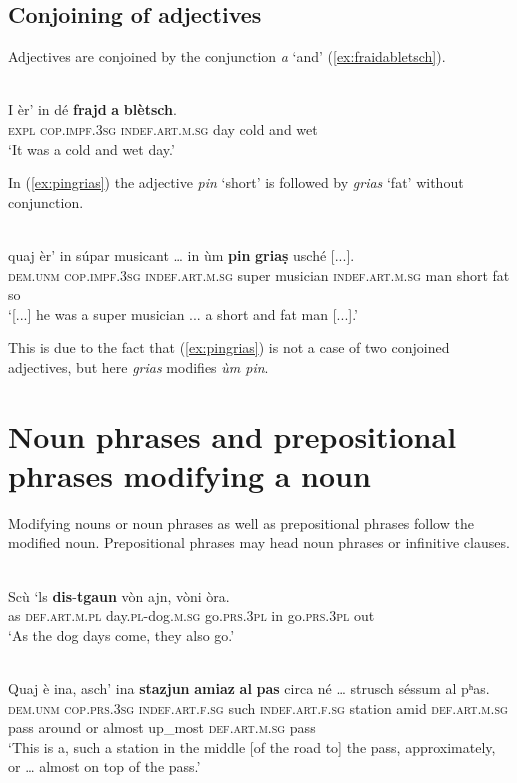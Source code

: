 \subsection{Conjoining of adjectives}
Adjectives are conjoined by the conjunction \textit{a} `and' (\ref{ex:fraidabletsch}).

\ea
\label{ex:fraidabletsch}
\\
\gll I èr' in dé \textbf{frajd} \textbf{a} \textbf{blètsch}.\\
\textsc{expl} \textsc{cop.impf.3sg} \textsc{indef.art.m.sg} day cold and wet\\
\glt `It was a cold and wet day.'
\z

In (\ref{ex:pingrias}) the adjective \textit{pin} `short' is followed by \textit{grias} `fat' without conjunction.

\ea
\label{ex:pingrias}
\\
	\gll [...] quaj èr’ in súpar musicant … in ùm \textbf{pin} \textbf{griaṣ} usché [...].\\
{} \textsc{dem.unm} \textsc{cop.impf.3sg} \textsc{indef.art.m.sg} super musician {} \textsc{indef.art.m.sg} man short fat so \\
\glt `[...] he was a super musician ... a short and fat man [...].'
\z

This is due to the fact that (\ref{ex:pingrias}) is not a case of two conjoined adjectives, but here \textit{grias} modifies \textit{ùm pin}.

\section{Noun phrases and prepositional phrases modifying a noun}
Modifying nouns or noun phrases as well as prepositional phrases follow the modified noun. Prepositional phrases may head noun phrases or infinitive clauses.

\ea
\label{ex:npnoun1}
\\
\gll  Scù `ls \textbf{dis}-\textbf{tgaun} vòn ajn, vòni òra.  \\
     as \textsc{def.art.m.pl} day.\textsc{pl}-dog.\textsc{m.sg} go.\textsc{prs.3pl} in go.\textsc{prs.3pl} out\\
\glt `As the dog days come, they also go.'
\z

\ea
{}\\
\gll Quaj è ina, asch’ ina \textbf{stazjun} \textbf{amiaz} \textbf{al} \textbf{pas} circa né … strusch séssum al pʰas.\\
\textsc{dem.unm} \textsc{cop.prs.3sg} \textsc{indef.art.f.sg} such \textsc{indef.art.f.sg} station amid \textsc{def.art.m.sg} pass around or {} almost up\_most \textsc{def.art.m.sg} pass\\
\glt `This is a, such a station in the middle [of the road to] the pass, approximately, or … almost on top of the pass.'
\z

